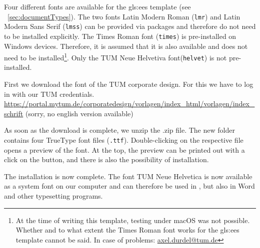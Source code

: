 Four different fonts are available for the \gls{gls:ees} template (see ~\autoref{sec:documentTypes}). The two fonts Latin Modern Roman (\texttt{lmr}) and Latin Modern Sans Serif (\texttt{lmss}) can be provided via packages and therefore do not need to be installed explicitly. The Times Roman font (\texttt{times}) is pre-installed on Windows devices. Therefore, it is assumed that it is also available and does not need to be installed\footnote{At the time of writing this template, testing under macOS was not possible. Whether and to what extent the Times Roman font works for the \gls{gls:ees} template cannot be said. In case of problems: \href{mailto:axel.durdel@tum.de}{axel.durdel@tum.de}}. Only the TUM Neue Helvetiva font(\texttt{helvet}) is not pre-installed. 

First we download the font of the TUM corporate design. For this we have to log in with our TUM credentials.\\
\url{https://portal.mytum.de/corporatedesign/vorlagen/index_html/vorlagen/index_schrift} (sorry, no english version available)

As soon as the download is complete, we unzip the .zip file. The new folder contains four TrueType font files (\texttt{.ttf}). Double-clicking on the respective file opens a preview of the font. At the top, the preview can be printed out with a click on the button, and there is also the possibility of installation. 

The installation is now complete. The font TUM Neue Helvetica is now available as a system font on our computer and can therefore be used in \Latex, but also in Word and other typesetting programs.